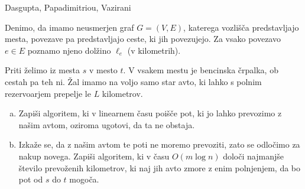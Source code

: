 \begin{naloga}%
{Dasgupta, Papadimitriou, Vazirani}{\cite[Exercise~4.13]{dpv}}
\begin{vprasanje}
Denimo, da imamo neusmerjen graf $G = (V, E)$,
katerega vozlišča pred\-stav\-lja\-jo mesta,
povezave pa predstavljajo ceste, ki jih povezujejo.
Za vsako povezavo $e \in E$ poznamo njeno dolžino $\ell_e$ (v kilometrih).

Priti želimo iz mesta $s$ v mesto $t$.
V vsakem mestu je bencinska črpalka, ob cestah pa teh ni.
Žal imamo na voljo samo star avto,
ki lahko s polnim rezervoarjem prepelje le $L$ kilometrov.
\begin{enumerate}[(a)]
\item Zapiši algoritem, ki v linearnem času poišče pot,
ki jo lahko prevozimo z našim avtom,
oziroma ugotovi, da ta ne obstaja.
\item Izkaže se, da z našim avtom te poti ne moremo prevoziti,
zato se odločimo za nakup novega.
Zapiši algoritem, ki v času $O(m \log n)$
določi najmanjše število prevoženih kilometrov,
ki naj jih avto zmore z enim polnjenjem,
da bo pot od $s$ do $t$ mogoča.
\end{enumerate}

\end{vprasanje}
\begin{odgovor}
\end{odgovor}
\end{naloga}
